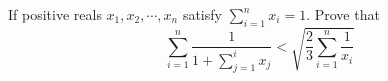 If positive reals $ x_1,x_2,\cdots,x_n $ satisfy $\sum_{i=1}^{n}x_i=1.$ Prove that$$\sum_{i=1}^{n}\frac{1}{1+\sum_{j=1}^{i}x_j}<\sqrt{\frac{2}{3}\sum_{i=1}^{n}\frac{1}{x_i}}
$$